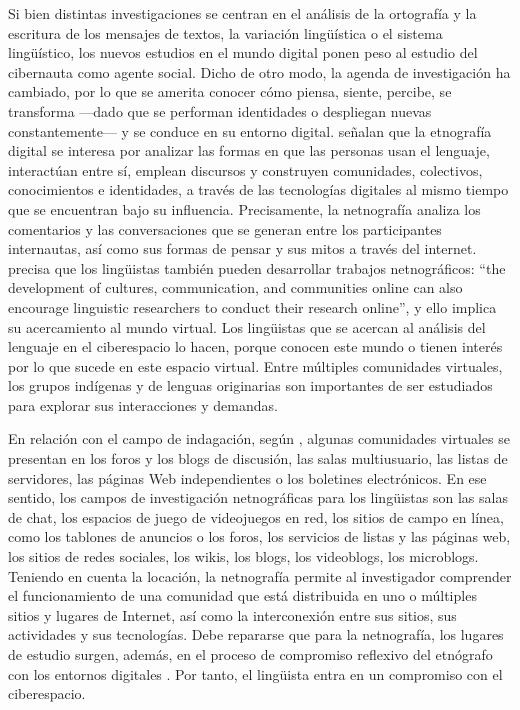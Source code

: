 Si bien distintas investigaciones se centran en el análisis de la
ortografía y la escritura de los mensajes de textos, la variación
lingüística o el sistema lingüístico, los nuevos estudios en el mundo
digital ponen peso al estudio del cibernauta como agente social. Dicho
de otro modo, la agenda de investigación ha cambiado, por lo que se
amerita conocer cómo piensa, siente, percibe, se transforma ---dado que
se performan identidades o despliegan nuevas constantemente--- y se
conduce en su entorno digital. \textcite{varis2019digital} señalan que la
etnografía digital se interesa por analizar las formas en que las
personas usan el lenguaje, interactúan entre sí, emplean discursos y
construyen comunidades, colectivos, conocimientos e identidades, a
través de las tecnologías digitales al mismo tiempo que se encuentran
bajo su influencia. Precisamente, la netnografía analiza los comentarios
y las conversaciones que se generan entre los participantes internautas,
así como sus formas de pensar y sus mitos a través del internet. \textcite[p. 41]{putrikusama2016} precisa que los lingüistas también pueden desarrollar
trabajos netnográficos: ``the development of cultures, communication,
and communities online can also encourage linguistic researchers to
conduct their research online'', y ello implica su acercamiento al mundo
virtual. Los lingüistas que se acercan al análisis del lenguaje en el
ciberespacio lo hacen, porque conocen este mundo o tienen interés por lo
que sucede en este espacio virtual. Entre múltiples comunidades
virtuales, los grupos indígenas y de lenguas originarias son importantes
de ser estudiados para explorar sus interacciones y demandas.

En relación con el campo de indagación, según \textcite{kozinets2002}, algunas
comunidades virtuales se presentan en los foros y los blogs de
discusión, las salas multiusuario, las listas de servidores, las páginas
Web independientes o los boletines electrónicos. En ese sentido, los
campos de investigación netnográficas para los lingüistas son las salas
de chat, los espacios de juego de videojuegos en red, los sitios de
campo en línea, como los tablones de anuncios o los foros, los servicios
de listas y las páginas web, los sitios de redes sociales, los wikis,
los blogs, los videoblogs, los microblogs. Teniendo en cuenta la
locación, la netnografía permite al investigador comprender el
funcionamiento de una comunidad que está distribuida en uno o múltiples
sitios y lugares de Internet, así como la interconexión entre sus
sitios, sus actividades y sus tecnologías. Debe repararse que para la
netnografía, los lugares de estudio surgen, además, en el proceso de
compromiso reflexivo del etnógrafo con los entornos digitales \cite{varis2019digital}. Por tanto, el lingüista entra en un compromiso con el
ciberespacio.

